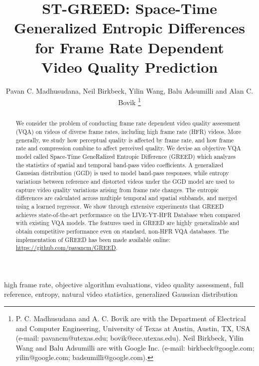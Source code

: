 \documentclass[journal]{IEEEtran}
\begin{document}
\title{ST-GREED: Space-Time Generalized Entropic Differences for Frame Rate Dependent \\Video Quality Prediction}


\author{Pavan C. Madhusudana, Neil Birkbeck, Yilin Wang,  Balu Adsumilli and Alan C. Bovik 
	\thanks{P. C. Madhusudana and A. C. Bovik are with the Department of Electrical and
Computer Engineering, University of Texas at Austin, Austin, TX, USA (e-mail:
pavancm@utexas.edu; bovik@ece.utexas.edu). Neil Birkbeck, Yilin Wang
and Balu Adsumilli are with Google Inc. (e-mail: birkbeck@google.com; yilin@google.com; badsumilli@google.com).}}




\maketitle

\begin{abstract}
We consider the problem of conducting frame rate dependent video quality assessment (VQA) on videos of diverse frame rates, including high frame rate (HFR) videos. More generally, we study how perceptual quality is affected by frame rate, and how frame rate and compression combine to affect perceived quality. We devise an objective VQA model called Space-Time GeneRalized Entropic Difference (GREED) which analyzes the statistics of spatial and temporal band-pass video coefficients. A generalized Gaussian distribution (GGD) is used to model band-pass responses, while entropy variations between reference and distorted videos under the GGD model are used to capture video quality variations arising from frame rate changes. The entropic differences are calculated across multiple temporal and spatial subbands, and merged using a learned regressor. We show through extensive experiments that GREED achieves state-of-the-art performance on the LIVE-YT-HFR Database when compared with existing VQA models. The features used in GREED are highly generalizable and obtain competitive performance even on standard, non-HFR VQA databases. The implementation of GREED has been made available online: \url{https://github.com/pavancm/GREED}.
\end{abstract}

\begin{IEEEkeywords}
high frame rate, objective algorithm evaluations, video quality assessment, full reference, entropy, natural video statistics, generalized Gaussian distribution
\end{IEEEkeywords}
\end{document}
